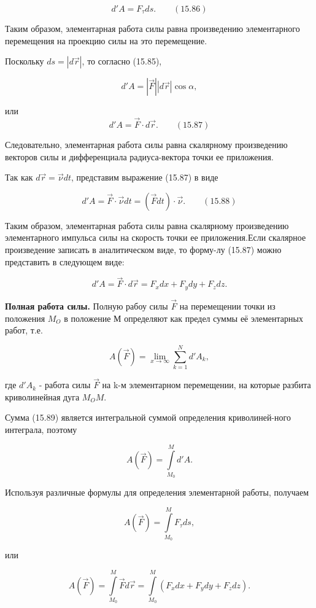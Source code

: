 {\begin{center}
	  $$d'A = F_{\tau} ds. \qquad (15.86)$$

	  \par Таким образом, элементарная работа силы равна произведению элементарного перемещения на проекцию силы на это перемещение.
	  \par Поскольку $ds = |d \vec r|$, то согласно (15.85),

	  $$d'A = |\vec F||d \vec r| \cos{\alpha},$$
	  \par или 
	  $$d'A = \vec F \cdot d \vec r. \qquad (15.87)$$
	  
	  \par Следовательно, элементарная работа силы равна скалярному произведению векторов силы и дифференциала радиуса-вектора точки ее приложения.
	  \par Так как $d \vec r = \vec\nu dt$, представим выражение (15.87) в виде

	  $$d'A = \vec F \cdot \vec\nu dt = (\vec F dt) \cdot \vec\nu. \qquad (15.88)$$

	  \par Таким образом, элементарная работа силы равна скалярному произведению элементарного импульса силы на скорость точки ее приложения.Если скалярное произведение записать в аналитическом виде, то форму-лу (15.87) можно представить в следующем виде:

	  $$d'A = \vec F \cdot d \vec r = F_x dx + F_y dy + F_z dz.$$

	  \par\textbf{Полная работа силы.} Полную рабоу силы $\vec F$ на перемещении точки из положения $M_O$ в положение М определяют как предел суммы её элементарных работ, т.е.

	  $$A(\vec F) = \lim_{x\to \infty} \sum\limits_{k=1}^N d'A_k,$$

	  \par где $d' A_k$ - работа силы $\vec F$ на k-м элементарном перемещении, на которые разбита криволинейная дуга $M_O M$.
      \par Сумма (15.89) является интегральной суммой определения криволиней-ного интеграла, поэтому

	  $$A(\vec F) = \int\limits_{M_0}^M d'A.$$

	  \par Используя различные формулы для определения элементарной работы, получаем

	  $$A(\vec F) = \int\limits_{M_0}^M F_{\tau} ds,$$
        \par или

	  $$A(\vec F) = \int\limits_{M_0}^M \vec F d \vec r = \int\limits_{M_0}^M (F_x dx + F_y dy + F_z dz).$$


\end{center}}
